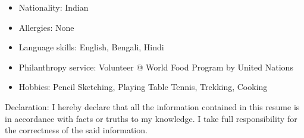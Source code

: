 \vspace{10mm}

\begin{itemize}
    \item Nationality: Indian
    \item Allergies: None
    \item Language skills: English, Bengali, Hindi
    \item Philanthropy service: Volunteer @ World Food Program by United Nations
    \item Hobbies: Pencil Sketching, Playing Table Tennis, Trekking, Cooking
\end{itemize}

\vspace{7mm}

\begin{justify}
    Declaration:\newline
    I hereby declare that all the information contained in this resume is in accordance with facts or truths to my knowledge. I take full responsibility for the correctness of the said information.
\end{justify}